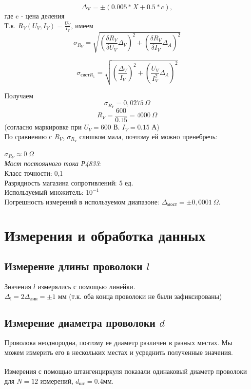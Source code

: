 \documentclass{article}
\begin{document}
	$$\Delta_{\text{V}} = \pm (0.005 * X + 0.5 * c),$$ где c - цена деления\\
	
	Т.к. $R_{V}(U_{V}, I_{V}) = \frac{U_{V}}{I_{V}}$, имеем 
	\[\sigma_{R_{V}} = \sqrt{ (\frac{\delta R_{V}}{\delta U_{V}}\Delta_{V})^{2} + (\frac{\delta R_{V}}{\delta I_{V}}\Delta_{A})^{2} }\]
	
	\[\sigma_{\text{сист}R_{1}} = \sqrt{ (\frac{\Delta_{V}}{I_{V}})^{2} + (\frac{U_{V}}{I_{V}^{2}}\Delta_{A})^{2} }\]
	
	Получаем $$\sigma_{R_{V}} = 0,0275 ~\Omega$$
	$$R_{V} = \frac{600}{0.15} = 4000 ~\Omega $$
	(согласно маркировке при $U_{V} = 600$ В. $I_{V} = 0.15$ А)\\
	
	По сравнению с $R_{V}$, $\sigma_{R_{V}}$ слишком мала, поэтому ей можно пренебречь:
	
	$\sigma_{R_{V}} \approx 0 ~\Omega$\\
	\emph{Мост постоянного тока Р4833}:\\
	Класс точности: 0,1\\
	Разрядность магазина сопротивлений: 5 ед.\\
	Используемый множитель: $10^{-1}$\\
	Погрешность измерений в используемом диапазоне: $\Delta_{\text{мост}} = \pm 0,0001 ~\Omega$.\\
	
	
	\section{Измерения и обработка данных}
	
	\subsection{Измерение длины проволоки $l$}
	Значения $l$ измерялись с помощью линейки.\\
	$\Delta_{\text{l}} = 2\Delta_{\text{лин}} = \pm 1\text{ мм}$ (т.к. оба конца проволоки не были зафиксированы)
	
	\subsection{Измерение диаметра проволоки $d$}
	Проволока неоднородна, поэтому ее диаметр различен в разных местах. Мы можем измерить его в нескольких местах и усреднить полученные значения.\\\\
	Измерения с помощью штангенциркуля показали одинаковый диаметр проволоки для $N = 12$ измерений, $d_{\text{шт}} = 0.4 \text{мм}$.\\
	
\end{document}
